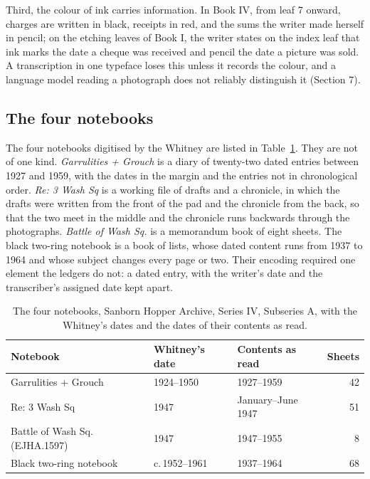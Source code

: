 \documentclass[11pt]{article}
\begin{document}
Third, the colour of ink carries information. In Book IV, from leaf 7 onward, charges are written in black, receipts in red, and the sums the writer made herself in pencil; on the etching leaves of Book I, the writer states on the index leaf that ink marks the date a cheque was received and pencil the date a picture was sold. A transcription in one typeface loses this unless it records the colour, and a language model reading a photograph does not reliably distinguish it (Section 7).

\subsection{The four notebooks}

The four notebooks digitised by the Whitney are listed in Table~\ref{tab:notebooks}. They are not of one kind. \emph{Garrulities + Grouch} is a diary of twenty-two dated entries between 1927 and 1959, with the dates in the margin and the entries not in chronological order. \emph{Re: 3 Wash Sq} is a working file of drafts and a chronicle, in which the drafts were written from the front of the pad and the chronicle from the back, so that the two meet in the middle and the chronicle runs backwards through the photographs. \emph{Battle of Wash Sq.} is a memorandum book of eight sheets. The black two-ring notebook is a book of lists, whose dated content runs from 1937 to 1964 and whose subject changes every page or two. Their encoding required one element the ledgers do not: a dated entry, with the writer's date and the transcriber's assigned date kept apart.

\begin{table}[htbp]\centering\small
\caption{The four notebooks, Sanborn Hopper Archive, Series IV, Subseries A, with the Whitney's dates and the dates of their contents as read.}\label{tab:notebooks}
\begin{tabular}{lllr}\toprule
Notebook & Whitney's date & Contents as read & Sheets\\\midrule
Garrulities + Grouch & 1924--1950 & 1927--1959 & 42\\
Re: 3 Wash Sq & 1947 & January--June 1947 & 51\\
Battle of Wash Sq. (EJHA.1597) & 1947 & 1947--1955 & 8\\
Black two-ring notebook & c.\,1952--1961 & 1937--1964 & 68\\\bottomrule
\end{tabular}
\end{table}
\end{document}
